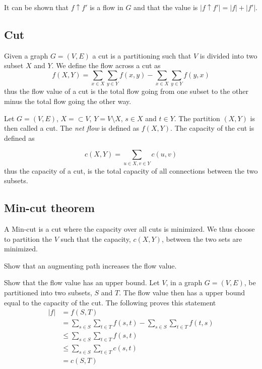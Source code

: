 \documentclass[10pt]{article}
\begin{document}
It can be shown that $f \uparrow f'$ is a flow in $G$ and that the value is $|f \uparrow f'| = |f| + |f'|$.

\subsection{Cut} %
\label{sub:cut}
Given a graph $G = (V,E)$ a cut is a partitioning such that $V$ is divided into two subset $X$ and $Y$. We define the flow across a cut as
\begin{equation}
  f(X,Y) = \sum_{x \in X} \sum_{y \in Y} f(x,y) - \sum_{x \in X} \sum_{y \in Y} f(y,x)
\end{equation} 
thus the flow value of a cut is the total flow going from one subset to the other minus the total flow going the other way.

Let $G = (V,E)$, $X  = \subset V$, $Y = V \setminus X$, $s \in X$ and $t \in Y$. The partition $(X,Y)$ is then called a cut. The \emph{net flow} is defined as $f(X,Y)$. The capacity of the cut is defined as

\begin{equation}
 c(X,Y) = \sum_{u \in X, v \in Y} c(u,v)
\end{equation}
thus the capacity of a cut, is the total capacity of all connections between the two subsets.


\subsection{Min-cut theorem} %
\label{sub:min_cut_theorem}
A Min-cut is a cut where the capacity over all cuts is minimized. We thus choose to partition the $V$ such that the capacity, $c(X,Y)$, between the two sets are minimized.

Show that an augmenting path increases the flow value.

Show that the flow value has an upper bound. Let $V$, in a graph $G = (V,E)$, be partitioned into two subsets, $S$ and $T$. The flow value then has a upper bound equal to the capacity of the cut. The following proves this statement
\begin{align*}
 |f| &= f(S,T)  \\ 
     &= \sum_{s \in S} \sum_{t \in T} f(s,t) - \sum_{s \in S} \sum_{t \in T} f(t,s) \\
     &\leq \sum_{s \in S} \sum_{t \in T} f(s,t) \\
     &\leq \sum_{s \in S} \sum_{t \in T} c(s,t) \\
     &= c(S,T)
\end{align*}
\end{document}
